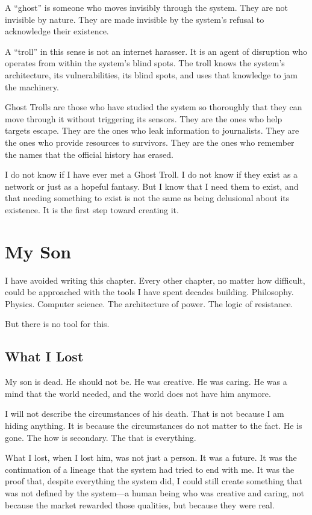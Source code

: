 \documentclass[11pt,openany]{book}
\begin{document}
A ``ghost'' is someone who moves invisibly through the system. They are not invisible by nature. They are made invisible by the system's refusal to acknowledge their existence.

A ``troll'' in this sense is not an internet harasser. It is an agent of disruption who operates from within the system's blind spots. The troll knows the system's architecture, its vulnerabilities, its blind spots, and uses that knowledge to jam the machinery.

Ghost Trolls are those who have studied the system so thoroughly that they can move through it without triggering its sensors. They are the ones who help targets escape. They are the ones who leak information to journalists. They are the ones who provide resources to survivors. They are the ones who remember the names that the official history has erased.

I do not know if I have ever met a Ghost Troll. I do not know if they exist as a network or just as a hopeful fantasy. But I know that I need them to exist, and that needing something to exist is not the same as being delusional about its existence. It is the first step toward creating it.

\chapter{My Son}

I have avoided writing this chapter. Every other chapter, no matter how difficult, could be approached with the tools I have spent decades building. Philosophy. Physics. Computer science. The architecture of power. The logic of resistance.

But there is no tool for this.

\section*{What I Lost}

My son is dead. He should not be. He was creative. He was caring. He was a mind that the world needed, and the world does not have him anymore.

I will not describe the circumstances of his death. That is not because I am hiding anything. It is because the circumstances do not matter to the fact. He is gone. The how is secondary. The that is everything.

What I lost, when I lost him, was not just a person. It was a future. It was the continuation of a lineage that the system had tried to end with me. It was the proof that, despite everything the system did, I could still create something that was not defined by the system---a human being who was creative and caring, not because the market rewarded those qualities, but because they were real.
\end{document}
